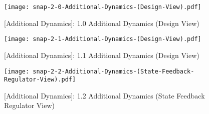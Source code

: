 \documentclass[crop=false,float=true,class=scrreprt]{standalone}
\begin{document}
\clearpage




\begin{landscape}
\begin{figure}[H]%
\centering%
\begin{minipage}[c][0.995\textheight][c]{0.995\linewidth}%
\centering%
\texttt{[image: snap-2-0-Additional-Dynamics-(Design-View).pdf]}%
\caption[{[Additional Dynamics]: 1.0 Additional Dynamics (Design View)}]%
        {{[Additional Dynamics]: 1.0 Additional Dynamics (Design View)%
          \label{FIG:controllerDesign:additionalDynamics:background:2p0:additionalDynamics:designView}%
        }}%
\end{minipage}%
\end{figure}
\end{landscape}




\clearpage




\begin{landscape}
\begin{figure}[H]%
\centering%
\begin{minipage}[c][0.995\textheight][c]{0.995\linewidth}%
\centering%
\texttt{[image: snap-2-1-Additional-Dynamics-(Design-View).pdf]}%
\caption[{[Additional Dynamics]: 1.1 Additional Dynamics (Design View)}]%
        {{[Additional Dynamics]: 1.1 Additional Dynamics (Design View)%
          \label{FIG:controllerDesign:additionalDynamics:background:2p1:additionalDynamics:designView}%
        }}%
\end{minipage}%
\end{figure}
\end{landscape}




\clearpage




\begin{landscape}
\begin{figure}[H]%
\centering%
\begin{minipage}[c][0.995\textheight][c]{0.995\linewidth}%
\centering%
\texttt{[image: snap-2-2-Additional-Dynamics-(State-Feedback-Regulator-View).pdf]}%
\caption[{[Additional Dynamics]: 1.2 Additional Dynamics (State Feedback Regulator View)}]%
        {{[Additional Dynamics]: 1.2 Additional Dynamics (State Feedback Regulator View)%
          \label{FIG:controllerDesign:additionalDynamics:background:2p2:additionalDynamics:stateFeedbackRegulatorView}%
        }}%
\end{minipage}%
\end{figure}
\end{landscape}
\end{document}
